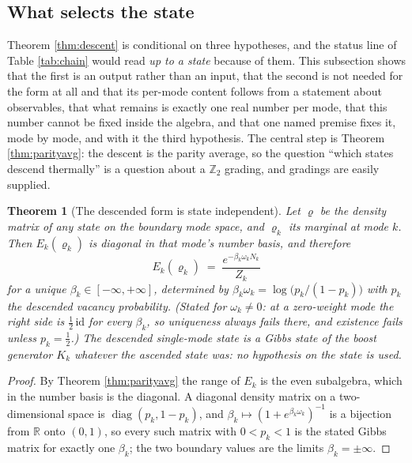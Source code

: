 \documentclass[11pt]{article}
\newtheorem{theorem}{Theorem}[section]
\theoremstyle{definition}
\newcommand{\R}{\mathbb{R}}
\begin{document}
\subsection{What selects the state}\label{subsec:selection}

Theorem \ref{thm:descent} is conditional on three hypotheses, and the status line of Table \ref{tab:chain} would read \emph{up to a state} because of them. This subsection shows that the first is an output rather than an input, that the second is not needed for the form at all and that its per-mode content follows from a statement about observables, that what remains is exactly one real number per mode, that this number cannot be fixed inside the algebra, and that one named premise fixes it, mode by mode, and with it the third hypothesis. The central step is Theorem \ref{thm:parityavg}: the descent is the parity average, so the question ``which states descend thermally'' is a question about a $\mathbb{Z}_2$ grading, and gradings are easily supplied.

\begin{theorem}[The descended form is state independent]\label{thm:form}
Let $\varrho$ be the density matrix of \emph{any} state on the boundary mode space, and $\varrho_k$ its marginal at mode $k$. Then $E_k(\varrho_k)$ is diagonal in that mode's number basis, and therefore
\[
E_k(\varrho_k) \;=\; \frac{e^{-\beta_k \omega_k N_k}}{Z_k}
\]
for a unique $\beta_k \in [-\infty, +\infty]$, determined by $\beta_k\omega_k = \log\bigl(p_k/(1-p_k)\bigr)$ with $p_k$ the descended vacancy probability. (Stated for $\omega_k \neq 0$: at a zero-weight mode the right side is $\tfrac12\,\mathrm{id}$ for every $\beta_k$, so uniqueness always fails there, and existence fails unless $p_k = \tfrac12$.) The descended single-mode state is a Gibbs state of the boost generator $K_k$ whatever the ascended state was: no hypothesis on the state is used.
\end{theorem}

\begin{proof}
By Theorem \ref{thm:parityavg} the range of $E_k$ is the even subalgebra, which in the number basis is the diagonal. A diagonal density matrix on a two-dimensional space is $\operatorname{diag}(p_k, 1 - p_k)$, and $\beta_k \mapsto (1 + e^{\beta_k\omega_k})^{-1}$ is a bijection from $\R$ onto $(0,1)$, so every such matrix with $0 < p_k < 1$ is the stated Gibbs matrix for exactly one $\beta_k$; the two boundary values are the limits $\beta_k = \pm\infty$.
\end{proof}
\end{document}
